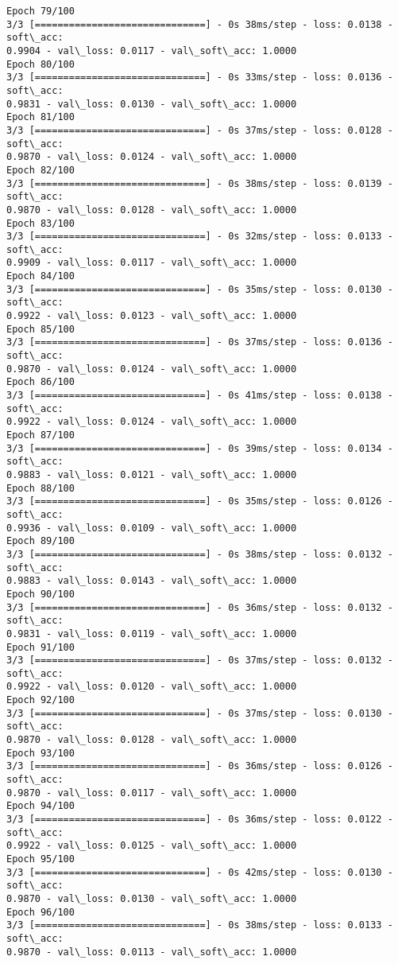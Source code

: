 \documentclass[11pt]{article}
\begin{document}
\begin{Verbatim}[commandchars=\\\{\}]
Epoch 79/100
3/3 [==============================] - 0s 38ms/step - loss: 0.0138 - soft\_acc:
0.9904 - val\_loss: 0.0117 - val\_soft\_acc: 1.0000
Epoch 80/100
3/3 [==============================] - 0s 33ms/step - loss: 0.0136 - soft\_acc:
0.9831 - val\_loss: 0.0130 - val\_soft\_acc: 1.0000
Epoch 81/100
3/3 [==============================] - 0s 37ms/step - loss: 0.0128 - soft\_acc:
0.9870 - val\_loss: 0.0124 - val\_soft\_acc: 1.0000
Epoch 82/100
3/3 [==============================] - 0s 38ms/step - loss: 0.0139 - soft\_acc:
0.9870 - val\_loss: 0.0128 - val\_soft\_acc: 1.0000
Epoch 83/100
3/3 [==============================] - 0s 32ms/step - loss: 0.0133 - soft\_acc:
0.9909 - val\_loss: 0.0117 - val\_soft\_acc: 1.0000
Epoch 84/100
3/3 [==============================] - 0s 35ms/step - loss: 0.0130 - soft\_acc:
0.9922 - val\_loss: 0.0123 - val\_soft\_acc: 1.0000
Epoch 85/100
3/3 [==============================] - 0s 37ms/step - loss: 0.0136 - soft\_acc:
0.9870 - val\_loss: 0.0124 - val\_soft\_acc: 1.0000
Epoch 86/100
3/3 [==============================] - 0s 41ms/step - loss: 0.0138 - soft\_acc:
0.9922 - val\_loss: 0.0124 - val\_soft\_acc: 1.0000
Epoch 87/100
3/3 [==============================] - 0s 39ms/step - loss: 0.0134 - soft\_acc:
0.9883 - val\_loss: 0.0121 - val\_soft\_acc: 1.0000
Epoch 88/100
3/3 [==============================] - 0s 35ms/step - loss: 0.0126 - soft\_acc:
0.9936 - val\_loss: 0.0109 - val\_soft\_acc: 1.0000
Epoch 89/100
3/3 [==============================] - 0s 38ms/step - loss: 0.0132 - soft\_acc:
0.9883 - val\_loss: 0.0143 - val\_soft\_acc: 1.0000
Epoch 90/100
3/3 [==============================] - 0s 36ms/step - loss: 0.0132 - soft\_acc:
0.9831 - val\_loss: 0.0119 - val\_soft\_acc: 1.0000
Epoch 91/100
3/3 [==============================] - 0s 37ms/step - loss: 0.0132 - soft\_acc:
0.9922 - val\_loss: 0.0120 - val\_soft\_acc: 1.0000
Epoch 92/100
3/3 [==============================] - 0s 37ms/step - loss: 0.0130 - soft\_acc:
0.9870 - val\_loss: 0.0128 - val\_soft\_acc: 1.0000
Epoch 93/100
3/3 [==============================] - 0s 36ms/step - loss: 0.0126 - soft\_acc:
0.9870 - val\_loss: 0.0117 - val\_soft\_acc: 1.0000
Epoch 94/100
3/3 [==============================] - 0s 36ms/step - loss: 0.0122 - soft\_acc:
0.9922 - val\_loss: 0.0125 - val\_soft\_acc: 1.0000
Epoch 95/100
3/3 [==============================] - 0s 42ms/step - loss: 0.0130 - soft\_acc:
0.9870 - val\_loss: 0.0130 - val\_soft\_acc: 1.0000
Epoch 96/100
3/3 [==============================] - 0s 38ms/step - loss: 0.0133 - soft\_acc:
0.9870 - val\_loss: 0.0113 - val\_soft\_acc: 1.0000

\end{Verbatim}
\end{document}
